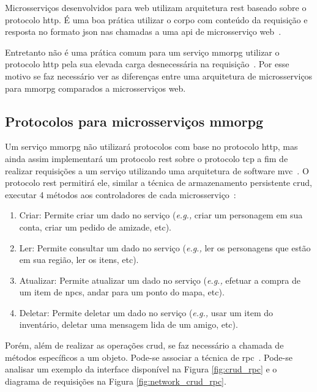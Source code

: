 Microsserviços desenvolvidos para web utilizam arquitetura \ac{rest} baseado sobre o protocolo \ac{http}.
%
É uma boa prática utilizar o corpo com conteúdo da requisição e resposta no formato \ac{json} nas chamadas a uma \ac{api} de microsserviço web~\cite{Nadareishvili2016Aug}.



Entretanto não é uma prática comum para um serviço \ac{mmorpg} utilizar o protocolo \ac{http} pela sua elevada carga desnecessária na requisição~\cite{1417630}.
%
Por esse motivo se faz necessário ver as diferenças entre uma arquitetura de microsserviços para \ac{mmorpg} comparados a microsserviços web.



\subsection{Protocolos para microsserviços \ac{mmorpg}}



Um serviço \ac{mmorpg} não utilizará protocolos com base no protocolo \ac{http}, mas ainda assim implementará um protocolo \ac{rest} sobre o protocolo \ac{tcp} a fim de realizar requisições a um serviço utilizando uma arquitetura de software \ac{mvc}~\cite{Chadwick2012Oct, LeckyThompson2008Nov}.
%
O protocolo \ac{rest} permitirá ele, similar a técnica de armazenamento persistente \ac{crud}, executar 4 métodos aos controladores de cada microsserviço~\cite{6267019}:



\begin{enumerate}
  \item Criar: Permite criar um dado no serviço (\textit{e.g.,} criar um personagem em sua conta, criar um pedido de amizade, etc).
  \item Ler: Permite consultar um dado no serviço (\textit{e.g.,} ler os personagens que estão em sua região, ler os itens, etc).
  \item Atualizar: Permite atualizar um dado no serviço (\textit{e.g.,} efetuar a compra de um item de \ac{npcs}, andar para um ponto do mapa, etc).
  \item Deletar: Permite deletar um dado no serviço (\textit{e.g.,} usar um item do inventário, deletar uma mensagem lida de um amigo, etc).
\end{enumerate}



Porém, além de realizar as operações \ac{crud}, se faz necessário a chamada de métodos específicos a um objeto.
%
Pode-se associar a técnica de \ac{rpc}~\cite{LeckyThompson2008Nov}. Pode-se analisar um exemplo da interface disponível na Figura \ref{fig:crud_rpc} e o diagrama de requisições na Figura \ref{fig:network_crud_rpc}.



